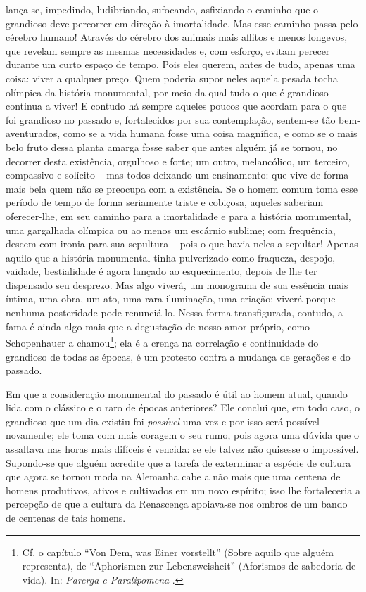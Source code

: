 lança-se, impedindo, ludibriando, sufocando, asfixiando o caminho que o
grandioso deve percorrer em direção à imortalidade. Mas esse caminho
passa pelo cérebro humano! Através do cérebro dos animais mais aflitos e
menos longevos, que revelam sempre as mesmas necessidades e, com
esforço, evitam perecer durante um curto espaço de tempo. Pois eles
querem, antes de tudo, apenas uma coisa: viver a qualquer preço. Quem
poderia supor neles aquela pesada tocha olímpica da história monumental,
por meio da qual tudo o que é grandioso continua a viver! E contudo há
sempre aqueles poucos que acordam para o que foi grandioso no passado e,
fortalecidos por sua contemplação, sentem-se tão bem-aventurados, como
se a vida humana fosse uma coisa magnífica, e como se o mais belo fruto
dessa planta amarga fosse saber que antes alguém já se tornou, no
decorrer desta existência, orgulhoso e forte; um outro, melancólico, um
terceiro, compassivo e solícito -- mas todos deixando um ensinamento:
que vive de forma mais bela quem não se preocupa com a existência. Se o
homem comum toma esse período de tempo de forma seriamente triste e
cobiçosa, aqueles saberiam oferecer-lhe, em seu caminho para a
imortalidade e para a história monumental, uma gargalhada olímpica ou ao
menos um escárnio sublime; com frequência, descem com ironia para sua
sepultura -- pois o que havia neles a sepultar! Apenas aquilo que a
história monumental tinha pulverizado como fraqueza, despojo, vaidade,
bestialidade é agora lançado ao esquecimento, depois de lhe ter
dispensado seu desprezo. Mas algo viverá, um monograma de sua essência
mais íntima, uma obra, um ato, uma rara iluminação, uma criação: viverá
porque nenhuma posteridade pode renunciá-lo. Nessa forma transfigurada,
contudo, a fama é ainda algo mais que a degustação de nosso
amor-próprio, como Schopenhauer a chamou\footnote{Cf. o capítulo ``Von
  Dem, was Einer vorstellt'' (Sobre aquilo que alguém representa), de
  ``Aphorismen zur Lebensweisheit'' (Aforismos de sabedoria de vida).
  In: \emph{Parerga e Paralipomena
  }.}; ela é a crença na correlação e
continuidade do grandioso de todas as épocas, é um protesto contra a
mudança de gerações e do passado.

Em que a consideração monumental do passado é útil ao homem atual,
quando lida com o clássico e o raro de épocas anteriores? Ele conclui
que, em todo caso, o grandioso que um dia existiu foi \emph{possível}
uma vez e por isso será possível novamente; ele toma com mais coragem o
seu rumo, pois agora uma dúvida que o assaltava nas horas mais difíceis
é vencida: se ele talvez não quisesse o impossível. Supondo-se que
alguém acredite que a tarefa de exterminar a espécie de cultura que
agora se tornou moda na Alemanha cabe a não mais que uma centena de
homens produtivos, ativos e cultivados em um novo espírito; isso lhe
fortaleceria a percepção de que a cultura da Renascença apoiava-se nos
ombros de um bando de centenas de tais homens.

